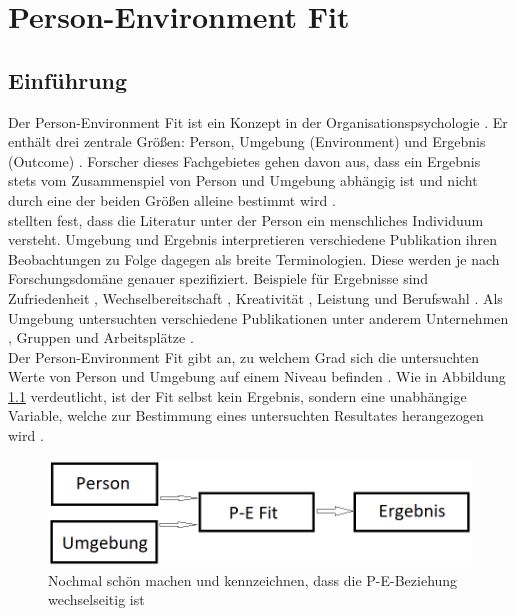 \chapter{Person-Environment Fit}
\label{ch:personEnvironmentFit}

\section{Einführung}
\label{ch:personEnvironmentFit:einfuehrung}
Der Person-Environment Fit ist ein Konzept in der Organisationspsychologie \cite[S. 1f.]{edwards:2008}. Er enthält drei zentrale Größen: Person, Umgebung (Environment) und Ergebnis (Outcome) \cite[S. 2f.]{livingstone:1997}. Forscher dieses Fachgebietes gehen davon aus, dass ein Ergebnis stets vom Zusammenspiel von Person und Umgebung abhängig ist und nicht durch eine der beiden Größen alleine bestimmt wird \cite[S. 1]{muchinsky:1987}.\\
\textcite[S. 5]{edwards:2007} stellten fest, dass die Literatur unter der Person ein menschliches Individuum versteht. Umgebung und Ergebnis interpretieren verschiedene Publikation ihren Beobachtungen zu Folge dagegen als breite Terminologien. Diese werden je nach Forschungsdomäne genauer spezifiziert. Beispiele für Ergebnisse sind Zufriedenheit \cite[S. 1]{lashani:2021}, Wechselbereitschaft \cite[S. 1]{amarneh:2021}, Kreativität \cite[S. 1]{duan:2019}, Leistung \cite[S. 7f.]{elfenbein:2007} und  Berufswahl \cite[S. 1]{cable:1996}. Als Umgebung untersuchten verschiedene Publikationen unter anderem Unternehmen \cite[S. 1]{kristof:1996}, Gruppen \cite[S. 1]{werbel:2001} und Arbeitsplätze \cite[S. 1]{lu:2014}.\\
Der Person-Environment Fit gibt an, zu welchem Grad sich die untersuchten Werte von Person und Umgebung auf einem Niveau befinden \cite[S. 3]{chatman:1989}. Wie in Abbildung \ref{fig:personEnvironmentFit:einfuehrung:abb1} verdeutlicht, ist der Fit selbst kein Ergebnis, sondern eine unabhängige Variable, welche zur Bestimmung eines untersuchten Resultates herangezogen wird \cite[S. 4f.]{edwards:1991}.\\
\begin{figure}[h]
	\centering
	\includegraphics[width=1\textwidth]{gfx/P-E Fit.png}
	\caption{Nochmal schön machen und kennzeichnen, dass die P-E-Beziehung wechselseitig ist}
	\label{fig:personEnvironmentFit:einfuehrung:abb1}
\end{figure}\\
